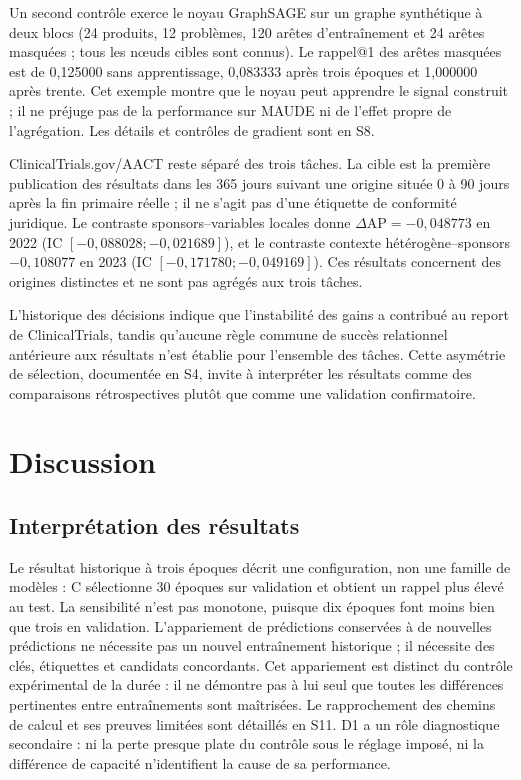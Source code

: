 Un second contrôle exerce le noyau GraphSAGE sur un graphe synthétique à deux blocs (24 produits, 12 problèmes, 120 arêtes d'entraînement et 24 arêtes masquées ; tous les nœuds cibles sont connus)\cite{hgbcode}. Le rappel@1 des arêtes masquées est de 0,125000 sans apprentissage, 0,083333 après trois époques et 1,000000 après trente. Cet exemple montre que le noyau peut apprendre le signal construit ; il ne préjuge pas de la performance sur MAUDE ni de l'effet propre de l'agrégation. Les détails et contrôles de gradient sont en S8.

ClinicalTrials.gov/AACT reste séparé des trois tâches. La cible est la première publication des résultats dans les 365 jours suivant une origine située 0 à 90 jours après la fin primaire réelle ; il ne s'agit pas d'une étiquette de conformité juridique. Le contraste sponsors--variables locales donne $\Delta\mathrm{AP}=-0,048773$ en 2022 (IC $[-0,088028;-0,021689]$), et le contraste contexte hétérogène--sponsors $-0,108077$ en 2023 (IC $[-0,171780;-0,049169]$)\cite{hgb2026,hgbhistory}. Ces résultats concernent des origines distinctes et ne sont pas agrégés aux trois tâches.

L'historique des décisions indique que l'instabilité des gains a contribué au report de ClinicalTrials, tandis qu'aucune règle commune de succès relationnel antérieure aux résultats n'est établie pour l'ensemble des tâches. Cette asymétrie de sélection, documentée en S4, invite à interpréter les résultats comme des comparaisons rétrospectives plutôt que comme une validation confirmatoire.

\section{Discussion}

\subsection{Interprétation des résultats}

Le résultat historique à trois époques décrit une configuration, non une famille de modèles : C sélectionne 30 époques sur validation et obtient un rappel plus élevé au test. La sensibilité n'est pas monotone, puisque dix époques font moins bien que trois en validation. L'appariement de prédictions conservées à de nouvelles prédictions ne nécessite pas un nouvel entraînement historique ; il nécessite des clés, étiquettes et candidats concordants. Cet appariement est distinct du contrôle expérimental de la durée : il ne démontre pas à lui seul que toutes les différences pertinentes entre entraînements sont maîtrisées. Le rapprochement des chemins de calcul et ses preuves limitées sont détaillés en S11. D1 a un rôle diagnostique secondaire : ni la perte presque plate du contrôle sous le réglage imposé, ni la différence de capacité n'identifient la cause de sa performance.

